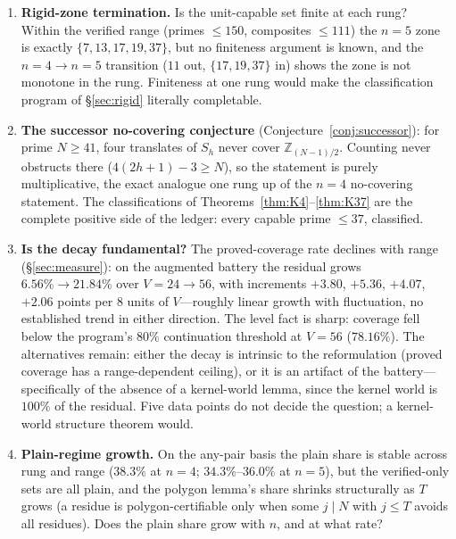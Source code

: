\documentclass[11pt,a4paper]{article}
\numberwithin{equation}{section}
\theoremstyle{plain}
\theoremstyle{definition}
\theoremstyle{remark}
\newcommand{\Z}{\mathbb{Z}}
\begin{document}
\begin{enumerate}[leftmargin=1.7em,itemsep=4pt]
\item \textbf{Rigid-zone termination.} Is the unit-capable set finite at
  each rung? Within the verified range (primes $\le 150$, composites
  $\le 111$) the $n=5$ zone is exactly $\{7,13,17,19,37\}$, but no
  finiteness argument is known, and the $n=4\to n=5$ transition
  ($11$ out, $\{17,19,37\}$ in) shows the zone is not monotone in the
  rung. Finiteness at one rung would make the classification program of
  \S\ref{sec:rigid} literally completable.

\item \textbf{The successor no-covering conjecture}
  (Conjecture~\ref{conj:successor}): for prime $N\ge 41$, four
  translates of $S_h$ never cover $\Z_{(N-1)/2}$. Counting never
  obstructs there ($4(2h+1)-3\ge N$), so the statement is purely
  multiplicative, the exact analogue one rung up of the $n=4$
  no-covering statement. The classifications of
  Theorems~\ref{thm:K4}--\ref{thm:K37} are the complete positive side of
  the ledger: every capable prime $\le 37$, classified.

\item \textbf{Is the decay fundamental?} The proved-coverage rate
  declines with range (\S\ref{sec:measure}): on the augmented battery
  the residual grows $6.56\%\to21.84\%$ over $V=24\to56$, with
  increments $+3.80$, $+5.36$, $+4.07$, $+2.06$ points per $8$ units of
  $V$---roughly linear growth with fluctuation, no established trend in
  either direction. The level fact is sharp: coverage fell below the
  program's $80\%$ continuation threshold at $V=56$ ($78.16\%$). The
  alternatives remain: either the decay is intrinsic to the
  reformulation (proved coverage has a range-dependent ceiling), or it
  is an artifact of the battery---specifically of the absence of a
  kernel-world lemma, since the kernel world is $100\%$ of the residual.
  Five data points do not decide the question; a kernel-world structure
  theorem would.

\item \textbf{Plain-regime growth.} On the any-pair basis the plain share
  is stable across rung and range ($38.3\%$ at $n=4$; $34.3\%$--$36.0\%$
  at $n=5$), but the verified-only sets are all plain, and the
  polygon lemma's share shrinks structurally as $T$ grows (a residue is
  polygon-certifiable only when some $j\mid N$ with $j\le T$ avoids all
  residues). Does the plain share grow with $n$, and at what rate?


\end{enumerate}
\end{document}
